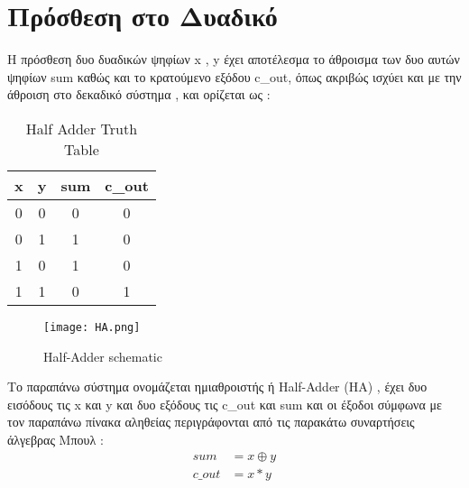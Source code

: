 

\section{Πρόσθεση στο Δυαδικό}

Η πρόσθεση δυο δυαδικών ψηφίων x , y έχει αποτέλεσμα το άθροισμα των δυο αυτών ψηφίων sum καθώς και το κρατούμενο εξόδου c\_out, όπως ακριβώς ισχύει και με την άθροιση στο δεκαδικό σύστημα , και ορίζεται ως :\\


\begin{table}[ht]
\centering
 \begin{tabular}{||c c | c c||} 
 \hline
 x & y & sum & c\_out \\ [0.5ex] 
 \hline\hline
 0 & 0 & 0 & 0 \\ 
 \hline
 0 & 1 & 1 & 0 \\
 \hline
 1 & 0 & 1 & 0 \\
 \hline
 1 & 1 & 0 & 1 \\
 \hline
\end{tabular}
\caption{Half Adder Truth Table}
\label{table:1}
\end{table}


\begin{figure}[ht]
\centering
\texttt{[image: HA.png]}
\caption{Half-Adder schematic}
\label{HASchematic}
\end{figure}


Το παραπάνω σύστημα ονομάζεται ημιαθροιστής ή Half-Adder (HA) , έχει δυο εισόδους τις x και y και δυο εξόδους τις c\_out και sum και οι έξοδοι σύμφωνα με τον παραπάνω πίνακα αληθείας περιγράφονται από τις παρακάτω συναρτήσεις άλγεβρας Μπουλ :\\
\begin{equation}
\begin{split}
    sum &= x \oplus y \\ 
    c\_out &= x * y
\end{split}
\end{equation}\\



